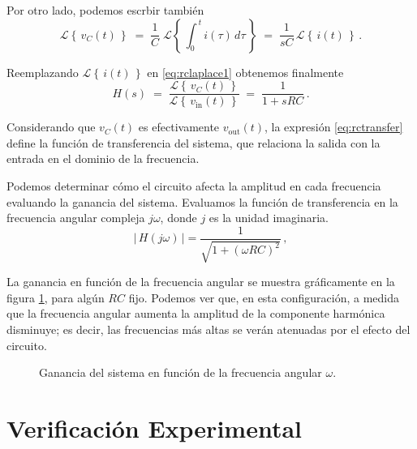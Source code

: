 \documentclass[parskip]{scrartcl}
\newcommand{\laplace}[1]{\mathcal{L}\left\{\,#1\,\right\}}
\begin{document}
Por otro lado, podemos escrbir también
%
$$ \laplace{v_C(t)} 
\;=\; \frac{1}{C}\;\laplace{\int_0^{\,t} i(\tau)\,d\tau}
\;=\; \frac{1}{sC}\,\laplace{i(t)} \,.$$

Reemplazando $\laplace{i(t)}$ en \eqref{eq:rclaplace1} obtenemos finalmente
%
\begin{equation}\label{eq:rctransfer}
H(s)
\;=\; \frac{\laplace{v_C(t)}}{\laplace{v_\mathrm{in}(t)}} 
\;=\; \frac{1}{1 + sRC}\,.
\end{equation}

Considerando que $v_C(t)$ es efectivamente $v_{\mathrm{out}}(t)$, la expresión \eqref{eq:rctransfer} define la función de transferencia del sistema,
que relaciona la salida con la entrada en el dominio de la frecuencia.

Podemos determinar cómo el circuito afecta la amplitud en cada frecuencia evaluando la ganancia del sistema. Evaluamos la función de transferencia en la frecuencia angular compleja $j\omega$, donde $j$ es la unidad imaginaria.
%
$$ \lvert\,H(j \omega)\,\rvert = \frac{1}{\sqrt{1 + (\omega RC)^2}}\,, $$

La ganancia en función de la frecuencia angular se muestra gráficamente en la figura \ref{fig:rcgain}, para algún $RC$ fijo. Podemos ver que, en esta configuración, a medida que la frecuencia angular aumenta la amplitud de la componente harmónica disminuye; es decir, las frecuencias más altas se verán atenuadas por el efecto del circuito.

\begin{figure}[t]
\centering
{}
\caption{Ganancia del sistema en función de la frecuencia angular $\omega$.}
\label{fig:rcgain}
\end{figure}

\section{Verificación Experimental}
\end{document}
